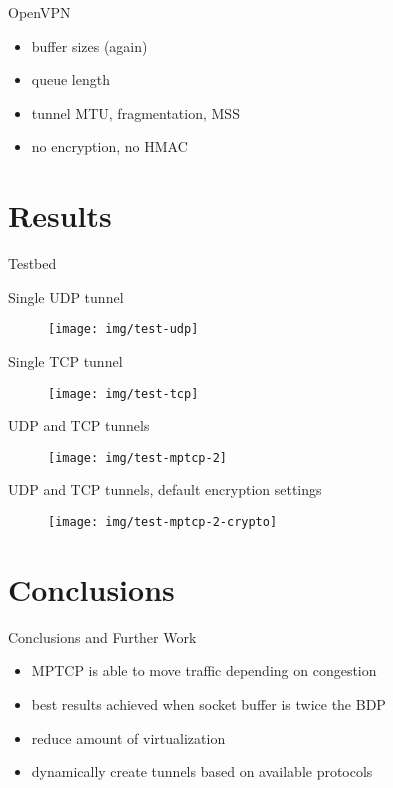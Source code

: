 \documentclass{beamer}
\begin{document}
\begin{frame}{OpenVPN}
  \begin{itemize}
    \item buffer sizes (again)
    \item queue length
    \item tunnel MTU, fragmentation, MSS
    \item no encryption, no HMAC
  \end{itemize}
\end{frame}

\section{Results}
\begin{frame}{Testbed}
\end{frame}

\begin{frame}{Single UDP tunnel}
  \begin{figure}
    \texttt{[image: img/test-udp]}
  \end{figure}
\end{frame}

\begin{frame}{Single TCP tunnel}
  \begin{figure}
    \texttt{[image: img/test-tcp]}
  \end{figure}
\end{frame}

\begin{frame}{UDP and TCP tunnels}
  \begin{figure}
    \texttt{[image: img/test-mptcp-2]}
  \end{figure}
\end{frame}

\begin{frame}{UDP and TCP tunnels, default encryption settings}
  \begin{figure}
    \texttt{[image: img/test-mptcp-2-crypto]}
  \end{figure}

\end{frame}

\section{Conclusions}
\begin{frame}{Conclusions and Further Work}
\begin{itemize}
    \item MPTCP is able to move traffic depending on congestion
    \item best results achieved when socket buffer is twice the BDP
    \item reduce amount of virtualization
    \item dynamically create tunnels based on available protocols
  \end{itemize}
\end{frame}
\end{document}
